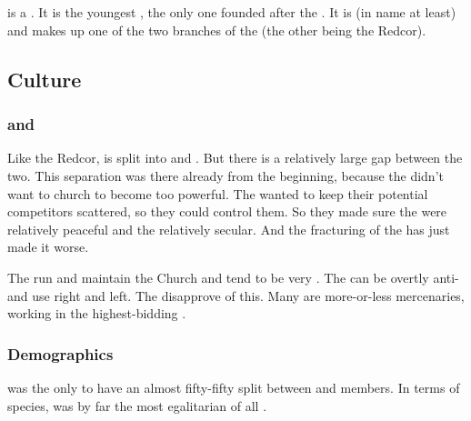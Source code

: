 \section{\Telcra}
\index{\Telcra}
\Telcra{} is a \VaimonClan. 
It is the youngest \vclan, the only one founded after the \darkfall. 
It is \Iquinian{} (in name at least) and makes up one of the two branches of the  (the other being the Redcor). 









\subsection{Culture}






\subsubsection{\Clerics{} and \templars}
\index{\cleric!\Telcra}
\index{\templar!\Telcra}
\index{\Telcra!\cleric}
\index{\Telcra!\templar}
Like the Redcor, \ClanTelcra{} is split into \clerics{} and \templars. 
But there is a relatively large gap between the two. 
This separation was there already from the beginning, because the \baccons{} didn't want to church to become too powerful. 
The \baccons{} wanted to keep their potential competitors scattered, so they could control them. 
So they made sure the \Telcra{} \clerics{} were relatively peaceful and the \templars{} relatively secular. 
And the fracturing of the \vclan has just made it worse. 

The \clerics{} run and maintain the \Telcra{} Church and tend to be very \Iquinian. 
The \templars{} can be overtly anti-\Iquinian{} and use \itzach{} right and left. 
The \clerics{} disapprove of this. 
Many \templars{} are more-or-less mercenaries, working in the highest-bidding \ishrah. 





\subsubsection{Demographics}
\ClanTelcra{} was the only \vclan to have an almost fifty-fifty split between \human{} and \scatha{} members. 
In terms of species, \Telcra{} was by far the most egalitarian of all \VaimonClans. 









